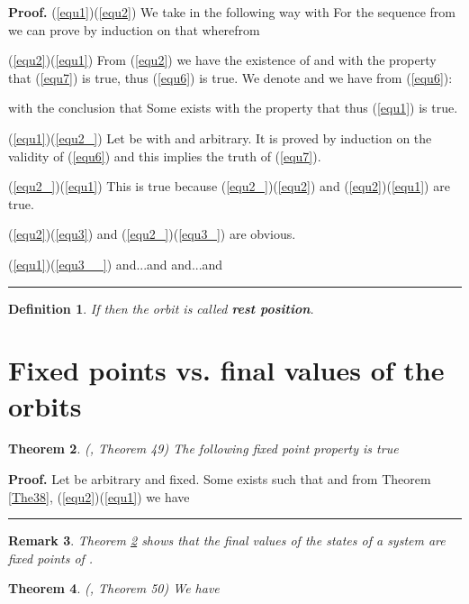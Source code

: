 \documentclass[12pt]{article}\usepackage{amsmath}
\newtheorem{theorem}{Theorem}
\newtheorem{definition}[theorem]{Definition}
\newtheorem{remark}[theorem]{Remark}
\newenvironment{proof}[1][Proof]{\textbf{#1.} }{\ \rule{0.5em}{0.5em}}
\begin{document}
\begin{proof}
(\ref{equ1})(\ref{equ2}) We take  in the
following way
with  For the sequence
from  we can prove by induction on  that
wherefrom


(\ref{equ2})(\ref{equ1}) From (\ref{equ2}) we have the
existence of  and  with the property that
(\ref{equ7}) is true, thus (\ref{equ6}) is true. We denote
and we have from (\ref{equ6}):








with the conclusion that
Some  exists with the property that
thus (\ref{equ1}) is true.

(\ref{equ1})(\ref{equ2_}) Let be
with  and  arbitrary.
It is proved by induction on  the validity of (\ref{equ6}) and this implies
the truth of (\ref{equ7}).

(\ref{equ2_})(\ref{equ1}) This is true because (\ref{equ2_})(\ref{equ2}) and (\ref{equ2})(\ref{equ1})
are true.

(\ref{equ2})(\ref{equ3}) and (\ref{equ2_})(\ref{equ3_}) are obvious.

(\ref{equ1})(\ref{equ3__})  and...and  and...and 
\end{proof}

\begin{definition}
If  then  the orbit  is called \textbf{rest position}.
\end{definition}

\section{Fixed points vs. final values of the orbits}

\begin{theorem}
\label{The8}(\cite{bib7}, Theorem 49) The following fixed point property is
true

\end{theorem}

\begin{proof}
Let  be
arbitrary and fixed. Some  exists such that 
and from Theorem \ref{The38}, (\ref{equ2})(\ref{equ1}) we
have 
\end{proof}

\begin{remark}
Theorem \ref{The8} shows that the final values of the states of a system are
fixed points of .
\end{remark}

\begin{theorem}
\label{The9}(\cite{bib7}, Theorem 50) We have 

\end{theorem}
\end{document}
